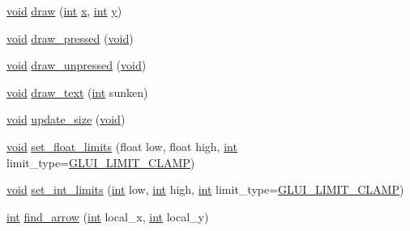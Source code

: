 \begin{DoxyCompactItemize}
\item 
\hyperlink{wglext_8h_a9e6b7f1933461ef318bb000d6bd13b83}{void} \hyperlink{class_g_l_u_i___spinner_ab2b6082a468a3cf5fd720dda38460230}{draw} (\hyperlink{wglext_8h_a500a82aecba06f4550f6849b8099ca21}{int} \hyperlink{glext_8h_ad77deca22f617d3f0e0eb786445689fc}{x}, \hyperlink{wglext_8h_a500a82aecba06f4550f6849b8099ca21}{int} \hyperlink{glext_8h_a9298c7ad619074f5285b32c6b72bfdea}{y})
\item 
\hyperlink{wglext_8h_a9e6b7f1933461ef318bb000d6bd13b83}{void} \hyperlink{class_g_l_u_i___spinner_add363e211d0f0638ce83cefe18853ec5}{draw\+\_\+pressed} (\hyperlink{wglext_8h_a9e6b7f1933461ef318bb000d6bd13b83}{void})
\item 
\hyperlink{wglext_8h_a9e6b7f1933461ef318bb000d6bd13b83}{void} \hyperlink{class_g_l_u_i___spinner_a7e2a6eab40bb6cd68732ae9a3a3eb1bc}{draw\+\_\+unpressed} (\hyperlink{wglext_8h_a9e6b7f1933461ef318bb000d6bd13b83}{void})
\item 
\hyperlink{wglext_8h_a9e6b7f1933461ef318bb000d6bd13b83}{void} \hyperlink{class_g_l_u_i___spinner_a0e5448695af2091ce345460e62c81936}{draw\+\_\+text} (\hyperlink{wglext_8h_a500a82aecba06f4550f6849b8099ca21}{int} sunken)
\item 
\hyperlink{wglext_8h_a9e6b7f1933461ef318bb000d6bd13b83}{void} \hyperlink{class_g_l_u_i___spinner_a4cde5eb0183892fc45de009844894e42}{update\+\_\+size} (\hyperlink{wglext_8h_a9e6b7f1933461ef318bb000d6bd13b83}{void})
\item 
\hyperlink{wglext_8h_a9e6b7f1933461ef318bb000d6bd13b83}{void} \hyperlink{class_g_l_u_i___spinner_ac6a2c44defbf97ef70375ab8d0f9cb45}{set\+\_\+float\+\_\+limits} (float low, float high, \hyperlink{wglext_8h_a500a82aecba06f4550f6849b8099ca21}{int} limit\+\_\+type=\hyperlink{glui_8h_ac968cb6b340a4e1cad7734abc769d934}{G\+L\+U\+I\+\_\+\+L\+I\+M\+I\+T\+\_\+\+C\+L\+A\+M\+P})
\item 
\hyperlink{wglext_8h_a9e6b7f1933461ef318bb000d6bd13b83}{void} \hyperlink{class_g_l_u_i___spinner_aa1a2609687a9ed2c6ab71944f052ed61}{set\+\_\+int\+\_\+limits} (\hyperlink{wglext_8h_a500a82aecba06f4550f6849b8099ca21}{int} low, \hyperlink{wglext_8h_a500a82aecba06f4550f6849b8099ca21}{int} high, \hyperlink{wglext_8h_a500a82aecba06f4550f6849b8099ca21}{int} limit\+\_\+type=\hyperlink{glui_8h_ac968cb6b340a4e1cad7734abc769d934}{G\+L\+U\+I\+\_\+\+L\+I\+M\+I\+T\+\_\+\+C\+L\+A\+M\+P})
\item 
\hyperlink{wglext_8h_a500a82aecba06f4550f6849b8099ca21}{int} \hyperlink{class_g_l_u_i___spinner_a760982be4e98d61b02bc907d175b6ae2}{find\+\_\+arrow} (\hyperlink{wglext_8h_a500a82aecba06f4550f6849b8099ca21}{int} local\+\_\+x, \hyperlink{wglext_8h_a500a82aecba06f4550f6849b8099ca21}{int} local\+\_\+y)

\end{DoxyCompactItemize}
